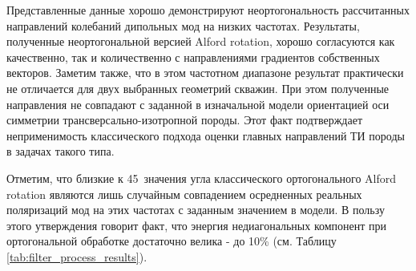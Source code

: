 \documentclass[a4paper,11pt]{article}
\begin{document}

Представленные данные хорошо демонстрируют неортогональность рассчитанных направлений колебаний дипольных мод на низких частотах. Результаты, полученные неортогональной версией Alford rotation, хорошо согласуются как качественно, так и количественно с направлениями градиентов собственных векторов. Заметим также, что в этом частотном диапазоне результат практически не отличается для двух выбранных геометрий скважин. При этом полученные направления не совпадают с заданной в изначальной модели ориентацией оси симметрии трансверсально-изотропной породы. Этот факт подтверждает неприменимость классического подхода оценки главных направлений ТИ породы в задачах такого типа. 

Отметим, что близкие к 45\textdegree \ значения угла классического ортогонального Alford rotation являются лишь случайным совпадением осредненных реальных поляризаций мод на этих частотах с заданным значением в модели. В пользу этого утверждения говорит факт, что энергия недиагональных компонент при ортогональной обработке достаточно велика - до 10\% (см. Таблицу \ref{tab:filter_process_results}). 
\end{document}
